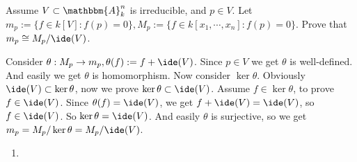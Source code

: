 \documentclass{ctexart}
\newif\ifpreface
\begin{document}
\large
\setlength{\baselineskip}{1.2em}
\ifpreface
  
  \newgeometry{left=2cm,right=2cm,top=2cm,bottom=2cm}
\else
  \maketitle
\fi
\begin{problem}
  Assume \(V \subset \mathbbm{A}_k^{n}\) is irreducible, and \(p \in V\).
  Let \(m_p := \{f \in k[V] : f(p) = 0\}, M_p := \{f \in k[x_1,\cdots,x_n]: f(p) = 0\}\).
  Prove that \(m_p \cong M_p/\ide(V)\).
\end{problem}

\begin{solution}
  Consider \( \theta : M_p \to m_p ,\theta(f) := f + \ide(V)\).
  Since \( p \in V\) we get \(\theta\) is well-defined.
  And easily we get \(\theta\) is homomorphism. Now consider \(\ker \theta\).
  Obviously \(\ide(V) \subset \ker \theta\), now we prove \(\ker \theta \subset \ide(V)\).
  Assume \( f \in \ker\theta\), to prove \(f \in \ide(V)\).
  Since \(\theta(f)=\ide(V)\), we get \(f+\ide(V)=\ide(V)\), so \(f \in \ide(V)\).
  So \(\ker \theta = \ide(V)\). And easily \(\theta\) is surjective, so we get
  \(m_p=M_p/\ker \theta=M_p / \ide(V)\).
\end{solution}
\begin{enumerate}
  \item
\end{enumerate}
\end{document}
